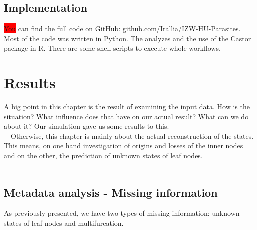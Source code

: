   \section{Implementation}
    \colorbox{red}{You} can find the full code on GitHub: 
      \hyperlink{github.com/Irallia/IZW-HU-Parasites}{github.com/Irallia/IZW-HU-Parasites}. \\
    Most of the code was written in Python. The analyzes and the use of the Castor package in R. There 
      are some shell scripts to execute whole workflows.

\chapter{Results}
  A big point in this chapter is the result of examining the input data. How is the situation? What 
    influence does that have on our actual result? What can we do about it? Our simulation gave us 
    some results to this. \\
  Otherwise, this chapter is mainly about the actual reconstruction of the states. This means, on 
    one hand investigation of origins and losses of the inner nodes and on the other, the prediction 
    of unknown states of leaf nodes. \\
   
  \section{Metadata analysis - Missing information}
    As previously presented, we have two types of missing information: unknown states of leaf nodes 
      and multifurcation. \\

